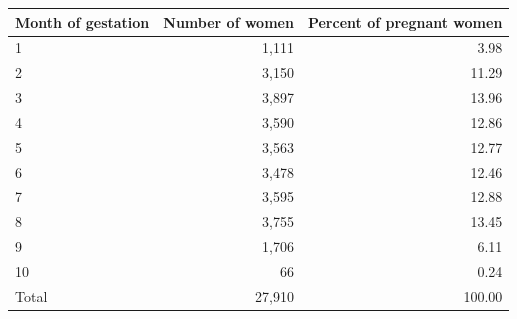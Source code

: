 \begin{tabular}{lrr} \toprule Month of gestation & Number of women & Percent of pregnant women \\ \midrule
\midrule
1                   &       1,111&        3.98\\
2                   &       3,150&       11.29\\
3                   &       3,897&       13.96\\
4                   &       3,590&       12.86\\
5                   &       3,563&       12.77\\
6                   &       3,478&       12.46\\
7                   &       3,595&       12.88\\
8                   &       3,755&       13.45\\
9                   &       1,706&        6.11\\
10                  &          66&        0.24\\
Total               &      27,910&      100.00\\
\bottomrule \end{tabular}
